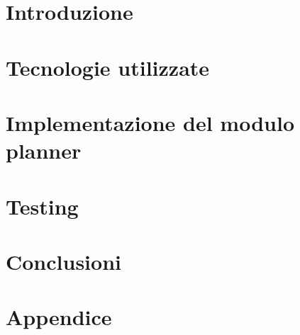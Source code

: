 \documentclass[12pt, twoside]{report}
\begin{document}
    
    \nocite{*}
    
    \pagestyle{empty}
    
    \tableofcontents
    \pagestyle{fancy}
    \chapter{Introduzione}
    
    \chapter{Tecnologie utilizzate}
    
    \chapter{Implementazione del modulo planner}
    
    \chapter{Testing}
    
    \chapter{Conclusioni}
    
    \chapter*{Appendice}
    
    
    \printbibliography
\end{document}
